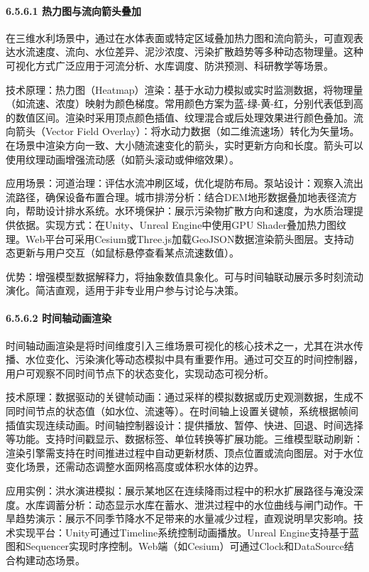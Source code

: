\paragraph{6.5.6.1 热力图与流向箭头叠加}\label{ux70edux529bux56feux4e0eux6d41ux5411ux7badux5934ux53e0ux52a0}

在三维水利场景中，通过在水体表面或特定区域叠加热力图和流向箭头，可直观表达水流速度、流向、水位差异、泥沙浓度、污染扩散趋势等多种动态物理量。这种可视化方式广泛应用于河流分析、水库调度、防洪预测、科研教学等场景。

技术原理：热力图（Heatmap）渲染：基于水动力模拟或实时监测数据，将物理量（如流速、浓度）映射为颜色梯度。常用颜色方案为蓝-绿-黄-红，分别代表低到高的数值区间。渲染时采用顶点颜色插值、纹理混合或后处理效果进行颜色叠加。流向箭头（Vector Field Overlay）：将水动力数据（如二维流速场）转化为矢量场。在场景中渲染方向一致、大小随流速变化的箭头，实时更新方向和长度。箭头可以使用纹理动画增强流动感（如箭头滚动或伸缩效果）。

应用场景：河道治理：评估水流冲刷区域，优化堤防布局。泵站设计：观察入流出流路径，确保设备布置合理。城市排涝分析：结合DEM地形数据叠加地表径流方向，帮助设计排水系统。水环境保护：展示污染物扩散方向和速度，为水质治理提供依据。实现方式：在Unity、Unreal Engine中使用GPU Shader叠加热力图纹理。Web平台可采用Cesium或Three.js加载GeoJSON数据渲染箭头图层。支持动态更新与用户交互（如鼠标悬停查看某点流速数值）。

优势：增强模型数据解释力，将抽象数值具象化。可与时间轴联动展示多时刻流动演化。简洁直观，适用于非专业用户参与讨论与决策。

\paragraph{6.5.6.2 时间轴动画渲染}\label{ux65f6ux95f4ux8f74ux52a8ux753bux6e32ux67d3}

时间轴动画渲染是将时间维度引入三维场景可视化的核心技术之一，尤其在洪水传播、水位变化、污染演化等动态模拟中具有重要作用。通过可交互的时间控制器，用户可观察不同时间节点下的状态变化，实现动态可视分析。

技术原理：数据驱动的关键帧动画：通过采样的模拟数据或历史观测数据，生成不同时间节点的状态值（如水位、流速等）。在时间轴上设置关键帧，系统根据帧间插值实现连续动画。时间轴控制器设计：提供播放、暂停、快进、回退、时间选择等功能。支持时间戳显示、数据标签、单位转换等扩展功能。三维模型联动刷新：渲染引擎需支持在时间推进过程中自动更新材质、顶点位置或流向图层。对于水位变化场景，还需动态调整水面网格高度或体积水体的边界。

应用实例：洪水演进模拟：展示某地区在连续降雨过程中的积水扩展路径与淹没深度。水库调蓄分析：动态显示水库在蓄水、泄洪过程中的水位曲线与闸门动作。干旱趋势演示：展示不同季节降水不足带来的水量减少过程，直观说明旱灾影响。技术实现平台：Unity可通过Timeline系统控制动画播放。Unreal Engine支持基于蓝图和Sequencer实现时序控制。Web端（如Cesium）可通过Clock和DataSource结合构建动态场景。

